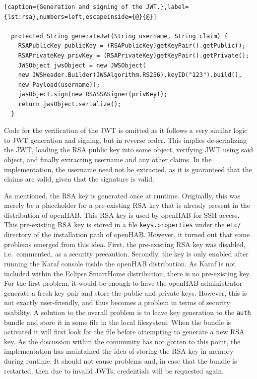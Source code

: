 \documentclass[12pt]{article}
\begin{document}
\begin{lstlisting}[caption={Generation and signing of the JWT.},label={lst:rsa},numbers=left,escapeinside={@}{@}]
    
  protected String generateJwt(String username, String claim) {
    RSAPublicKey publicKey = (RSAPublicKey)getKeyPair().getPublic();
    RSAPrivateKey privKey = (RSAPrivateKey)getKeyPair().getPrivate();
    JWSObject jwsObject = new JWSObject(
    new JWSHeader.Builder(JWSAlgorithm.RS256).keyID("123").build(),
    new Payload(username));
    jwsObject.sign(new RSASSASigner(privKey));
    return jwsObject.serialize();	
  }    
\end{lstlisting}

Code for the verification of the JWT is omitted as it follows a very similar logic to JWT generation and signing, but in reverse order. This implies de-serializing the JWT, loading the RSA public key into some object, verifying JWT using said object, and finally extracting username and any other claims. In the implementation, the username need not be extracted, as it is guaranteed that the claims are valid, given that the signature is valid.

As mentioned, the RSA key is generated once at runtime. Originally, this was merely be a placeholder for a pre-existing RSA key that is already present in the distribution of openHAB. This RSA key is used by openHAB for SSH access. This pre-existing RSA key is stored in a file \texttt{keys.properties} under the \texttt{etc/} directory of the installation path of openHAB. However, it turned out that some problems emerged from this idea. First, the pre-existing RSA key was disabled, i.e.\ commented, as a security precaution. Secondly, the key is only enabled after running the Karaf console inside the openHAB distribution. As Karaf is not included within the Eclipse SmartHome distribution, there is no pre-existing key. For the first problem, it would be enough to have the openHAB administrator generate a fresh key pair and store the public and private keys. However, this is not exactly user-friendly, and thus becomes a problem in terms of security usability. A solution to the overall problem is to leave key generation to the \texttt{auth} bundle and store it in some file in the local filesystem. When the bundle is activated it will first look for the file before attempting to generate a new RSA key. As the discussion within the community has not gotten to this point, the implementation has maintained the idea of storing the RSA key in memory during runtime. It should not cause problems and, in case that the bundle is restarted, then due to invalid JWTs, credentials will be requested again.
\end{document}
